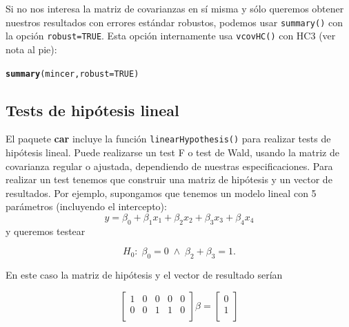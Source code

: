 \documentclass{article}\usepackage[]{graphicx}\usepackage[]{color}
\makeatletter
\newcommand{\hlnum}[1]{\textcolor[rgb]{0.686,0.059,0.569}{#1}}%
\newcommand{\hlstd}[1]{\textcolor[rgb]{0.345,0.345,0.345}{#1}}%
\newcommand{\hlkwc}[1]{\textcolor[rgb]{0.333,0.667,0.333}{#1}}%
\newcommand{\hlkwd}[1]{\textcolor[rgb]{0.737,0.353,0.396}{\textbf{#1}}}%
\newenvironment{kframe}{%
 \def\at@end@of@kframe{}%
 \ifinner\ifhmode%
  \def\at@end@of@kframe{\end{minipage}}%
  \begin{minipage}{\columnwidth}%
 \fi\fi%
 \def\FrameCommand##1{\hskip\@totalleftmargin \hskip-\fboxsep
 \colorbox{shadecolor}{##1}\hskip-\fboxsep
     \hskip-\linewidth \hskip-\@totalleftmargin \hskip\columnwidth}%
 \MakeFramed {\advance\hsize-\width
   \@totalleftmargin\z@ \linewidth\hsize
   \@setminipage}}%
 {\par\unskip\endMakeFramed%
 \at@end@of@kframe}
\newenvironment{knitrout}{}{} %
\newcommand*{\paq}[1]{\textbf{#1}}
\makeatother
\begin{document}
Si no nos interesa la matriz de covarianzas en sí misma y sólo queremos obtener nuestros resultados con errores estándar robustos, podemos usar \verb|summary()| con la opción \verb|robust=TRUE|. Esta opción internamente usa \verb|vcovHC()| con HC3 (ver nota al pie):

\begin{knitrout}
\color{fgcolor}\begin{kframe}
\begin{alltt}
\hlkwd{summary}\hlstd{(mincer,} \hlkwc{robust} \hlstd{=} \hlnum{TRUE}\hlstd{)}
\end{alltt}
\end{kframe}
\end{knitrout}


\subsection{Tests de hipótesis lineal}

El paquete \paq{car} incluye la función \verb|linearHypothesis()| para realizar tests de hipótesis lineal. Puede realizarse un test F o test de Wald, usando la matriz de covarianza regular o ajustada, dependiendo de nuestras especificaciones. Para realizar un test tenemos que construir una matriz de hipótesis y un vector de resultados. Por ejemplo, supongamos que tenemos un modelo lineal con 5 parámetros (incluyendo el intercepto):
\begin{equation*}
y = \beta_0 + \beta_1 x_1 + \beta_2 x_2 + \beta_3 x_3 + \beta_4 x_4
\end{equation*}
y queremos testear

\begin{equation*}
H_0 : \; \beta_0 = 0 \; \wedge \; \beta_2 + \beta_3 = 1.
\end{equation*}

En este caso la matriz de hipótesis y el vector de resultado serían

\begin{equation*}
\begin{bmatrix}
    1 & 0 & 0 & 0 & 0 \\
    0 & 0 & 1 & 1 & 0 \\
\end{bmatrix}
\beta = 
\begin{bmatrix}
    0 \\
    1 \\
\end{bmatrix}
\end{equation*}
\end{document}

